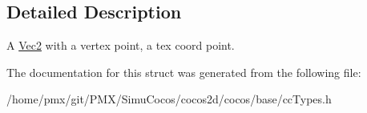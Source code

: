 \subsection{Detailed Description}
A \hyperlink{classVec2}{Vec2} with a vertex point, a tex coord point. 

The documentation for this struct was generated from the following file\+:\begin{DoxyCompactItemize}
\item 
/home/pmx/git/\+P\+M\+X/\+Simu\+Cocos/cocos2d/cocos/base/cc\+Types.\+h\end{DoxyCompactItemize}
